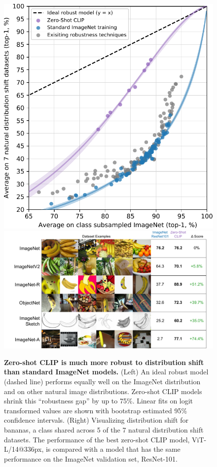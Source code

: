 \documentclass{article}
\begin{document}
\begin{figure}[t]
\begin{center}
\includegraphics[width=0.71\columnwidth]{zs-clip-vs-imagenet-robustness-plot.pdf}
\includegraphics[width=1.29\columnwidth]{zs-clip-vs-imagenet-robustness-datasets.pdf}
\caption{\textbf{Zero-shot CLIP is much more robust to distribution shift than standard ImageNet models.} (Left) An ideal robust model (dashed line) performs equally well on the ImageNet distribution and on other natural image distributions. Zero-shot CLIP models shrink this ``robustness gap'' by up to 75\%. Linear fits on logit transformed values are shown with bootstrap estimated 95\% confidence intervals. (Right) Visualizing distribution shift for bananas, a class shared across 5 of the 7 natural distribution shift datasets. The performance of the best zero-shot CLIP model, ViT-L/14@336px, is compared with a model that has the same performance on the ImageNet validation set, ResNet-101.}
\label{robust_main_fig}
\end{center}
\end{figure}
\end{document}
